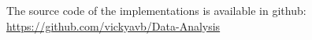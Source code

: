 \appendix

The source code of the implementations is available in github: \url{https://github.com/vickyavb/Data-Analysis}